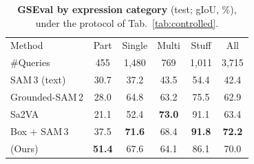 \begin{table}[t]
\centering
\caption{\textbf{GSEval by expression category} (test; gIoU, \%), under the protocol of Tab.~\ref{tab:controlled}.}
\label{tab:gseval_categories}
\setlength{\tabcolsep}{5pt}
\begin{tabular}{l ccccc}
\toprule
Method & Part & Single & Multi & Stuff & All \\
\#Queries & 455 & 1{,}480 & 769 & 1{,}011 & 3{,}715 \\
\midrule
SAM\,3 (text)     & 30.7 & 37.2 & 43.5 & 54.4 & 42.4 \\
Grounded-SAM\,2   & 28.0 & 64.8 & 63.2 & 75.5 & 62.9 \\
Sa2VA             & 21.1 & 52.4 & \textbf{73.0} & 91.1 & 63.4 \\
Box + SAM\,3      & 37.5 & \textbf{71.6} & 68.4 & \textbf{91.8} & \textbf{72.2} \\
\rowcolor{oursrow}
\ours{} (Ours)    & \textbf{51.4} & 67.6 & 64.1 & 86.1 & 70.0 \\
\bottomrule
\end{tabular}
\end{table}

